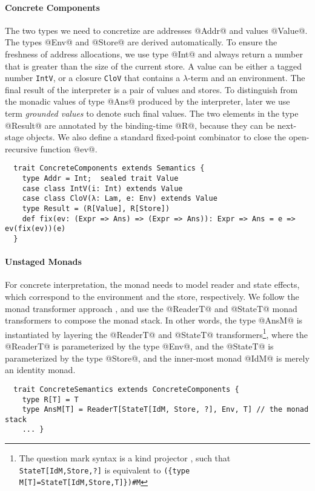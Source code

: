 \paragraph{Concrete Components}
The two types we need to concretize are addresses @Addr@ and values @Value@. The
types @Env@ and @Store@ are derived automatically. To ensure the freshness of
address allocations, we use type @Int@ and always return a number that is greater
than the size of the current store.
A value can be either a tagged number \texttt{IntV}, or a closure
\texttt{CloV} that contains a $\lambda$-term and an environment. The final
result of the interpreter is a pair of values and stores.
To distinguish from the monadic values of type @Ans@ produced by the
interpreter, later we use term \textit{grounded values} to denote such final values.
The two elements in the type @Result@ are annotated by the binding-time @R@,
because they can be next-stage objects.  We also define a standard fixed-point
combinator to close the open-recursive function @ev@.
\begin{lstlisting}
  trait ConcreteComponents extends Semantics {
    type Addr = Int;  sealed trait Value
    case class IntV(i: Int) extends Value
    case class CloV(λ: Lam, e: Env) extends Value
    type Result = (R[Value], R[Store])
    def fix(ev: (Expr => Ans) => (Expr => Ans)): Expr => Ans = e => ev(fix(ev))(e)
  }
\end{lstlisting}

\paragraph{Unstaged Monads}
For concrete interpretation, the monad needs to model reader and state effects,
which correspond to the environment and the store, respectively. We follow the
monad transformer approach \cite{DBLP:conf/popl/LiangHJ95},
and use the @ReaderT@ and @StateT@ monad transformers to
compose the monad stack. In other words, the type @AnsM@ is
instantiated by layering the @ReaderT@ and @StateT@ transformers\footnote{The
question mark syntax is a kind projector \cite{kindprojector}, such that
\texttt{StateT[IdM,Store,?]} is equivalent to \newline \texttt{(\{type
M[T]=StateT[IdM,Store,T]\})\#M}}, where the @ReaderT@ is parameterized by the
type @Env@, and the @StateT@ is parameterized by the type @Store@, and the
inner-most monad @IdM@ is merely an identity monad.
\begin{lstlisting}
  trait ConcreteSemantics extends ConcreteComponents {
    type R[T] = T
    type AnsM[T] = ReaderT[StateT[IdM, Store, ?], Env, T] // the monad stack
    ... }
\end{lstlisting}


